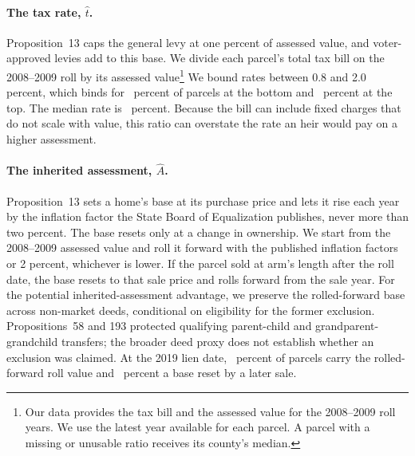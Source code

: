 \paragraph{The tax rate, $\hat t$.} Proposition~13 caps the general levy at
one percent of assessed value, and voter-approved levies add to this base. We divide
each parcel's total tax bill on the 2008--2009 roll by its assessed value\footnote{Our data provides the tax bill and the assessed value for the 2008--2009 roll years. We use the latest year available for each parcel. A parcel with a missing or unusable ratio receives its county's median.}  We bound rates between 0.8 and 2.0 percent, which binds for
\WedgeRateLowerShare\ percent of parcels at the bottom and
\WedgeRateUpperShare\ percent at the top. The median rate is
\WedgeMedianRate\ percent. Because the bill can include fixed charges that do
not scale with value, this ratio can overstate the rate an heir would pay on a
higher assessment.

\paragraph{The inherited assessment, $\hat A$.} Proposition~13 sets a home's
base at its purchase price and lets it rise each year by the inflation
factor the State Board of Equalization publishes, never more than two
percent. The base resets only at a change in ownership. We start from the
2008--2009 assessed value and roll it forward with the published inflation factors or 2 percent, whichever is lower. If the parcel sold at arm's length after the roll date, the
base resets to that sale price and rolls forward from the sale year.
For the potential inherited-assessment advantage, we preserve the rolled-forward
base across non-market deeds, conditional on eligibility for the former exclusion.
Propositions~58 and 193 protected qualifying parent-child and grandparent-grandchild
transfers; the broader deed proxy does not establish whether an exclusion was claimed.
At the
2019 lien date, \WedgeShareRollBase\ percent of parcels carry the rolled-forward
roll value and \WedgeShareSaleReset\ percent a base reset by a later sale.

